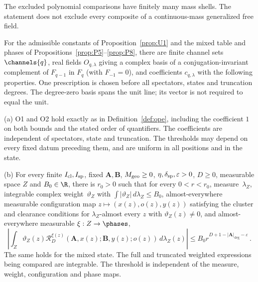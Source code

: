 \begin{remark}
The excluded polynomial comparisons have finitely many mass shells. The statement does not exclude every composite of a continuous-mass generalized free field.
\end{remark}

\begin{proposition}\label{prop:P12}
For the admissible constants of Proposition~\ref{prop:U1} and the mixed table and phases of Propositions~\ref{prop:P5}--\ref{prop:P8}, there are finite channel sets $\channels{q}$, real fields $O_{q,\lambda}$ giving a complex basis of a conjugation-invariant complement of $F_{q-1}$ in $F_q$ (with $F_{-1}=0$), and coefficients $c_{q,\lambda}$ with the following properties. One prescription is chosen before all spectators, states and truncation degrees. The degree-zero basis spans the unit line; its vector is not required to equal the unit.

(a) O1 and O2 hold exactly as in Definition~\ref{def:ope}, including the coefficient $1$ on both bounds and the stated order of quantifiers. The coefficients are independent of spectators, state and truncation. The thresholds may depend on every fixed datum preceding them, and are uniform in all positions and in the state.

(b) For every finite $I_{\rm cl},I_{\rm sp}$, fixed $\boldsymbol A,\boldsymbol B$, $M_{\rm geo}\ge0$, $\eta,\delta_{\rm sp},\varepsilon>0$, $D\ge0$, measurable space $Z$ and $B_0\in\R$, there is $r_0>0$ such that for every $0<r<r_0$, measure~$\lambda_Z$, integrable complex weight~$\vartheta_Z$ with $\int|\vartheta_Z|\,d\lambda_Z\le B_0$, almost-everywhere measurable configuration map $z\mapsto(x(z),o(z),y(z))$ satisfying the cluster and clearance conditions for $\lambda_Z$-almost every $z$ with $\vartheta_Z(z)\ne0$, and almost-everywhere measurable $\xi:Z\to\phases$,
\begin{equation}\label{eq:P12-1}
\left|\int_Z\vartheta_Z(z)\mathcal R_D^{\xi(z)}(\boldsymbol A,x(z);\boldsymbol B,y(z);o(z))\,d\lambda_Z(z)\right|\le B_0r^{D+1-|\boldsymbol A|_{\deg}-\varepsilon}\,.
\end{equation}
The same holds for the mixed state. The full and truncated weighted expressions being compared are integrable. The threshold is independent of the measure, weight, configuration and phase maps.


\end{proposition}
